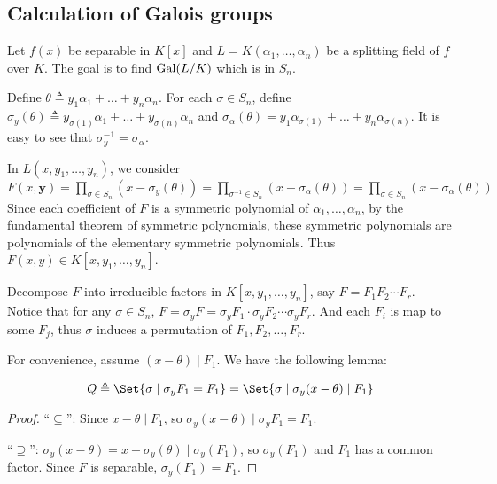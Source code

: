 \subsection{Calculation of Galois groups}
Let $f(x)$ be separable in $K[x]$ and $L = K(\alpha_1, \dots, \alpha_n)$ be a splitting field of
$f$ over $K$. The goal is to find $\operatorname{Gal}(L/K)$ which is in $S_n$.

Define $\theta \triangleq y_1 \alpha_1 + \dots + y_n \alpha_n$. For each $\sigma \in S_n$,
define $\sigma_y(\theta) \triangleq y_{\sigma(1)} \alpha_1 + \dots + y_{\sigma(n)} \alpha_n$ and
$\sigma_{\alpha}(\theta) = y_1 \alpha_{\sigma(1)} + \dots + y_n \alpha_{\sigma(n)}$.
It is easy to see that $\sigma_y^{-1} = \sigma_\alpha$. 

In $L(x, y_1, \dots, y_n)$, we consider $F(x, \bm{y}) = \prod_{\sigma \in S_n} (x - \sigma_y(\theta))
= \prod_{\sigma^{-1} \in S_n} (x - \sigma_{\alpha}(\theta)) = \prod_{\sigma \in S_n} (x - \sigma_\alpha(\theta))$
Since each coefficient of $F$ is a symmetric polynomial of $\alpha_1, \dots, \alpha_n$,
by the fundamental theorem of symmetric polynomials, these symmetric polynomials are
polynomials of the elementary symmetric polynomials. Thus $F(x, y) \in K[x, y_1, \dots, y_n]$.

Decompose $F$ into irreducible factors in $K[x, y_1, \dots, y_n]$, say $F = F_1 F_2 \dotsm F_r$.
Notice that for any $\sigma \in S_n$, $F = \sigma_y F = \sigma_y F_1 \cdot \sigma_y F_2 \dotsm \sigma_y F_r$.
And each $F_i$ is map to some $F_j$, thus $\sigma$ induces a permutation of $F_1, F_2, \dots, F_r$.

For convenience, assume $(x - \theta) \mid F_1$. We have the following lemma:

\begin{lemma}
  \[ Q \triangleq \Set{ \sigma \mid \sigma_y F_1 = F_1 } = \Set{ \sigma \mid \sigma_y(x - \theta) \mid F_1} \]
  \begin{proof}
    ``$\subseteq$'': Since $x - \theta \mid F_1$, so $\sigma_y (x - \theta) \mid \sigma_y F_1 = F_1$.

    ``$\supseteq$'': $\sigma_y(x - \theta) = x - \sigma_y(\theta) \mid \sigma_y(F_1)$, so $\sigma_y(F_1)$
    and $F_1$ has a common factor. Since $F$ is separable, $\sigma_y(F_1) = F_1$.
  \end{proof}
\end{lemma}

